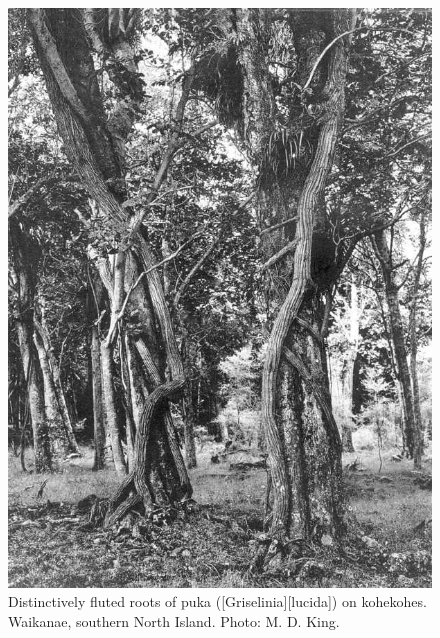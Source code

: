 \begin{figure}[htb]
	\centering
	\begin{minipage}[t]{0.486\textwidth}
		\centering
		\includegraphics[width=\textwidth]{graphics/figure46puka-roots.jpg}
    	\caption[Distinctively fluted roots of puka on kohekohes]{Distinctively fluted roots of puka ([Griselinia][lucida]) on kohekohes.
    	Waikanae, southern North Island.
    	Photo: M. D. King.}%
    	\label{fig:46puka-roots}
	\end{minipage}\hfill%
	\begin{minipage}[t]{0.494\textwidth}
    	\centering

\end{minipage}
\end{figure}
